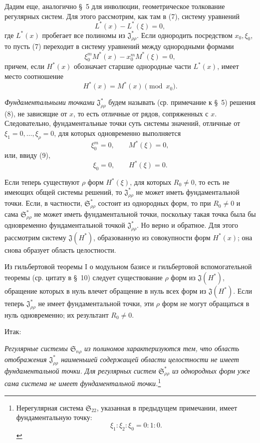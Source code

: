 \documentclass[11pt]{article}
\providecommand{\Ssys}{\mathfrak{S}}
\providecommand{\Jdom}{\mathfrak{J}}
\begin{document}
Дадим еще, аналогично \S\ 5 для инволюции, геометрическое толкование регулярных систем. Для этого рассмотрим, как там в (7), систему уравнений
\begin{equation}
  L^*(x)-L^*(\xi)=0,
\tag{7}
\end{equation}
где $L^*(x)$ пробегает все полиномы из $\Jdom^*_{\rho\rho}$. Если однородить посредством $x_0,\xi_0$, то пусть (7) переходит в систему уравнений между однородными формами
\begin{equation}
  \xi_0^{m}M^*(x)-x_0^{m}M^*(\xi)=0,
\tag{8}
\end{equation}
причем, если $H^*(x)$ обозначает старшие однородные части $L^*(x)$, имеет место соотношение
\begin{equation}
  H^*(x)=M^*(x)\pmod{x_0}.
\tag{9}
\end{equation}

\emph{Фундаментальными точками} $\Jdom^*_{\rho\rho}$ будем называть (ср. примечание к \S\ 5) решения (8), не зависящие от $x$, то есть отличные от рядов, сопряженных с $x$. Следовательно, фундаментальные точки суть системы значений, отличные от $\xi_1=0,\ldots,\xi_\rho=0$, для которых одновременно выполняется
\[
  \xi_0^m=0,\qquad M^*(\xi)=0,
\]
или, ввиду (9),
\[
  \xi_0=0,
  \qquad H^*(\xi)=0.
\]

Если теперь существуют $\rho$ форм $H^*(\xi)$, для которых $R_0\ne0$, то есть не имеющих общей системы решений, то $\Jdom^*_{\rho\rho}$ не может иметь фундаментальной точки. Если, в частности, $\Ssys^*_{\rho\rho}$ состоит из однородных форм, то при $R_0\ne0$ и сама $\Ssys^*_{\rho\rho}$ не может иметь фундаментальной точки, поскольку такая точка была бы одновременно фундаментальной точкой $\Jdom^*_{\rho\rho}$. Но верно и обратное. Для этого рассмотрим систему $\Jdom(H^*)$, образованную из совокупности форм $H^*(x)$; она снова образует область целостности.

Из гильбертовой теоремы I о модульном базисе и гильбертовой вспомогательной теоремы (ср. цитату в \S\ 10) следует существование $\rho$ форм из $\Jdom(H^*)$, обращение которых в нуль влечет обращение в нуль всех форм из $\Jdom(H^*)$. Если теперь $\Jdom^*_{\rho\rho}$ не имеет фундаментальной точки, эти $\rho$ форм не могут обращаться в нуль одновременно; их результант $R_0\ne0$.

Итак:

\emph{Регулярные системы $\Ssys_{n\rho}$ из полиномов характеризуются тем, что область отображения $\Jdom^*_{\rho\rho}$ наименьшей содержащей области целостности не имеет фундаментальной точки. Для регулярных систем $\Ssys^*_{\rho\rho}$ из однородных форм уже сама система не имеет фундаментальной точки.}\footnote{Нерегулярная система $\Ssys_{22}$, указанная в предыдущем примечании, имеет фундаментальную точку:
\[
  \xi_1:\xi_2:\xi_0=0:1:0.
\]}
\end{document}
